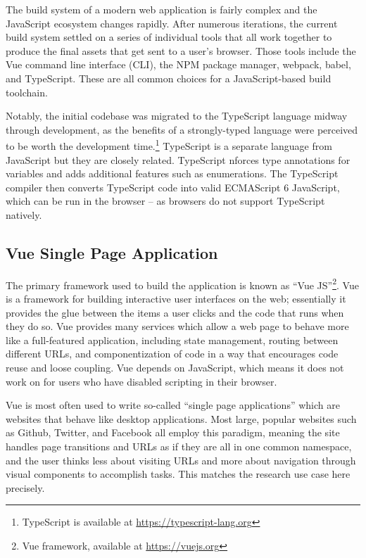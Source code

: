 The build system of a modern web application is fairly complex and the JavaScript ecosystem changes rapidly. After numerous iterations, the current build system settled on a series of individual tools that all work together to produce the final assets that get sent to a user's browser. Those tools include the Vue command line interface (CLI), the NPM package manager, webpack, babel, and TypeScript. These are all common choices for a JavaScript-based build toolchain.

Notably, the initial codebase was migrated to the TypeScript language midway through development, as the benefits of a strongly-typed language were perceived to be worth the development time.\footnote{TypeScript is available at \url{https://typescript-lang.org}} TypeScript is a separate language from JavaScript but they are closely related. TypeScript nforces type annotations for variables and adds additional features such as enumerations. The TypeScript compiler then converts TypeScript code into valid ECMAScript 6 JavaScript, which can be run in the browser -- as browsers do not support TypeScript natively.

\hypertarget{vue-single-page-application}{%
\subsection{Vue Single Page Application}\label{vue-single-page-application}}

The primary framework used to build the application is known as ``Vue JS''\footnote{Vue framework, available at \url{https://vuejs.org}}. Vue is a framework for building interactive user interfaces on the web; essentially it provides the glue between the items a user clicks and the code that runs when they do so. Vue provides many services which allow a web page to behave more like a full-featured application, including state management, routing between different URLs, and componentization of code in a way that encourages code reuse and loose coupling. Vue depends on JavaScript, which means it does not work on for users who have disabled scripting in their browser.

Vue is most often used to write so-called ``single page applications'' which are websites that behave like desktop applications. Most large, popular websites such as Github, Twitter, and Facebook all employ this paradigm, meaning the site handles page transitions and URLs as if they are all in one common namespace, and the user thinks less about visiting URLs and more about navigation through visual components to accomplish tasks. This matches the research use case here precisely.

